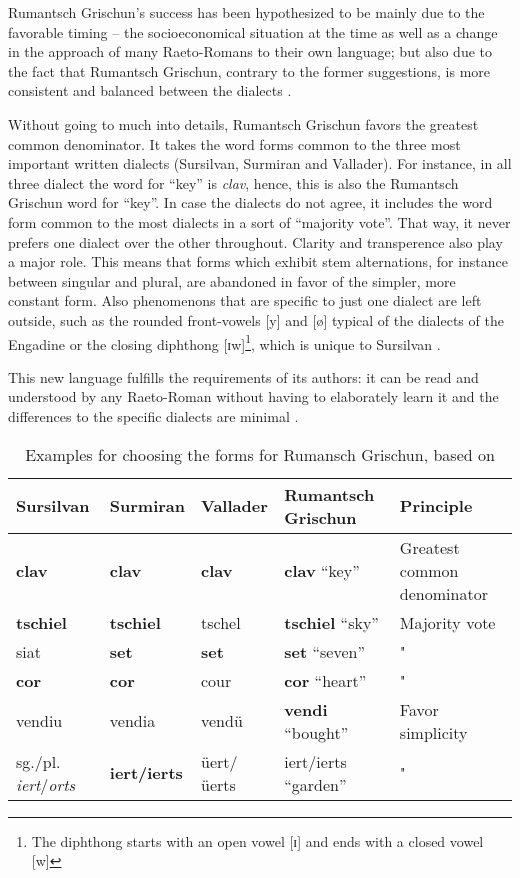 Rumantsch Grischun's success has been hypothesized to be mainly due to the favorable timing -- the socioeconomical situation at the time as well as a change in the approach of many Raeto-Romans to their own language; but also due to the fact that Rumantsch Grischun, contrary to the former suggestions, is more consistent and balanced between the dialects \autocite[69]{liver1999}.

Without going to much into details, Rumantsch Grischun favors the greatest common denominator. 
It takes the word forms common to the three most important written dialects (Sursilvan, Surmiran and Vallader). For instance, in all three dialect the word for \enquote{key} is \emph{clav}, hence, this is also the Rumantsch Grischun word for \enquote{key}.
In case the dialects do not agree, it includes the word form common to the most dialects in a sort of \enquote{majority vote}. 
That way, it never prefers one dialect over the other throughout. 
Clarity and transperence also play a major role. 
This means that forms which exhibit stem alternations, for instance between singular and plural, are abandoned in favor of the simpler, more constant form.
Also phenomenons that are specific to just one dialect are left outside, such as the rounded front-vowels [y] and [ø] typical of the dialects of the Engadine or the closing diphthong [ɪw]\footnote{The diphthong starts with an open vowel [ɪ] and ends with a closed vowel [w]}, which is unique to Sursilvan \autocite[70]{liver1999}.

This new language fulfills the requirements of its authors: it can be read and understood by any Raeto-Roman without having to elaborately learn it and the differences to the specific dialects are minimal \autocite[72]{liver1999}. 


\begin{table}
\centering
\begin{tabular}{lllll}
\toprule
Sursilvan & Surmiran & Vallader & Rumantsch Grischun & Principle \\
\midrule
\textbf{clav}	  &  \textbf{clav}    &  \textbf{clav}    & \textbf{clav}  \enquote{key}  & Greatest common denominator \\
\textbf{tschiel}       &   \textbf{tschiel}   & tschel      & \textbf{tschiel} \enquote{sky} & Majority vote \\
siat 	 & \textbf{set}      & \textbf{set}      & \textbf{set} \enquote{seven} & " \\
\textbf{cor} & \textbf{cor} & cour & \textbf{cor} \enquote{heart} & " \\
vendiu & vendia & vendü & \textbf{vendi} \enquote{bought} & Favor simplicity \\
sg./pl. \emph{iert}/\emph{orts} & \textbf{iert/ierts} & üert/üerts & iert/ierts \enquote{garden} & " \\
\bottomrule

\end{tabular}
\caption{Examples for choosing the forms for Rumansch Grischun, based on \cite[70-71]{liver1999}}
\label{tab:rg-examples}
\end{table}


